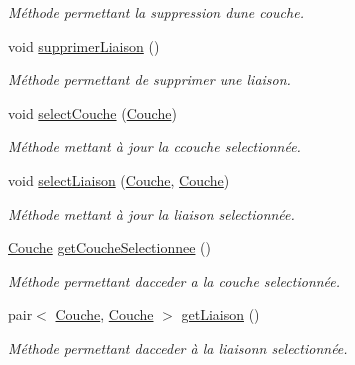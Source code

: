 \begin{DoxyCompactItemize}
\begin{DoxyCompactList}\small\item\em Méthode permettant la suppression d\textquotesingle{}une couche. \end{DoxyCompactList}\item 
\mbox{\label{classPanneauArchitecture_af6e7d198ef558f75d8826cf9d52a1248}} 
void \hyperlink{classPanneauArchitecture_af6e7d198ef558f75d8826cf9d52a1248}{supprimer\+Liaison} ()
\begin{DoxyCompactList}\small\item\em Méthode permettant de supprimer une liaison. \end{DoxyCompactList}\item 
\mbox{\label{classPanneauArchitecture_a7670673acd7e9eb1e77e2cb5eb929079}} 
void \hyperlink{classPanneauArchitecture_a7670673acd7e9eb1e77e2cb5eb929079}{select\+Couche} (\hyperlink{classCouche}{Couche})
\begin{DoxyCompactList}\small\item\em Méthode mettant à jour la ccouche selectionnée. \end{DoxyCompactList}\item 
\mbox{\label{classPanneauArchitecture_a2e4ab85ad5fbc8801bf7ea3fab0ea197}} 
void \hyperlink{classPanneauArchitecture_a2e4ab85ad5fbc8801bf7ea3fab0ea197}{select\+Liaison} (\hyperlink{classCouche}{Couche}, \hyperlink{classCouche}{Couche})
\begin{DoxyCompactList}\small\item\em Méthode mettant à jour la liaison selectionnée. \end{DoxyCompactList}\item 
\mbox{\label{classPanneauArchitecture_a77c5b0be02105db0a55ec022cc319e4b}} 
\hyperlink{classCouche}{Couche} \hyperlink{classPanneauArchitecture_a77c5b0be02105db0a55ec022cc319e4b}{get\+Couche\+Selectionnee} ()
\begin{DoxyCompactList}\small\item\em Méthode permettant d\textquotesingle{}acceder a la couche selectionnée. \end{DoxyCompactList}\item 
\mbox{\label{classPanneauArchitecture_a8502f49ce3c223fa9cfe73b6621d5da8}} 
pair$<$ \hyperlink{classCouche}{Couche}, \hyperlink{classCouche}{Couche} $>$ \hyperlink{classPanneauArchitecture_a8502f49ce3c223fa9cfe73b6621d5da8}{get\+Liaison} ()
\begin{DoxyCompactList}\small\item\em Méthode permettant d\textquotesingle{}acceder à la liaisonn selectionnée. \end{DoxyCompactList}\end{DoxyCompactItemize}


